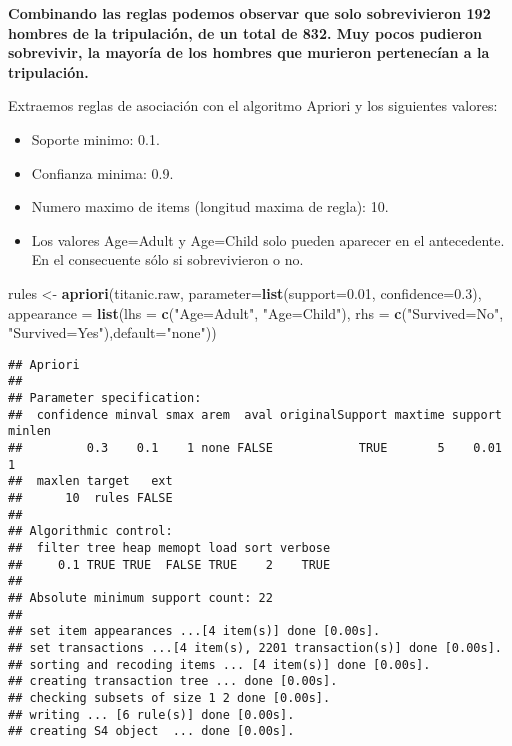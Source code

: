 \documentclass[]{article}
\newenvironment{Shaded}{\begin{snugshade}}{\end{snugshade}}
\newcommand{\DataTypeTok}[1]{\textcolor[rgb]{0.13,0.29,0.53}{#1}}
\newcommand{\FloatTok}[1]{\textcolor[rgb]{0.00,0.00,0.81}{#1}}
\newcommand{\KeywordTok}[1]{\textcolor[rgb]{0.13,0.29,0.53}{\textbf{#1}}}
\newcommand{\NormalTok}[1]{#1}
\newcommand{\StringTok}[1]{\textcolor[rgb]{0.31,0.60,0.02}{#1}}
\providecommand{\tightlist}{%
  \setlength{\itemsep}{0pt}\setlength{\parskip}{0pt}}
\begin{document}
\textbf{Combinando las reglas podemos observar que solo sobrevivieron
192 hombres de la tripulación, de un total de 832. Muy pocos pudieron
sobrevivir, la mayoría de los hombres que murieron pertenecían a la
tripulación.}

Extraemos reglas de asociación con el algoritmo Apriori y los siguientes
valores:

\begin{itemize}
\tightlist
\item
  Soporte minimo: 0.1.
\item
  Confianza minima: 0.9.
\item
  Numero maximo de items (longitud maxima de regla): 10.
\item
  Los valores Age=Adult y Age=Child solo pueden aparecer en el
  antecedente. En el consecuente sólo si sobrevivieron o no.
\end{itemize}

\begin{Shaded}
\begin{Highlighting}[]
\NormalTok{rules <-}\StringTok{ }\KeywordTok{apriori}\NormalTok{(titanic.raw, }\DataTypeTok{parameter=}\KeywordTok{list}\NormalTok{(}\DataTypeTok{support=}\FloatTok{0.01}\NormalTok{, }\DataTypeTok{confidence=}\FloatTok{0.3}\NormalTok{), }
                 \DataTypeTok{appearance =} \KeywordTok{list}\NormalTok{(}\DataTypeTok{lhs =} \KeywordTok{c}\NormalTok{(}\StringTok{"Age=Adult"}\NormalTok{, }\StringTok{"Age=Child"}\NormalTok{), }
                                   \DataTypeTok{rhs =} \KeywordTok{c}\NormalTok{(}\StringTok{"Survived=No"}\NormalTok{, }\StringTok{"Survived=Yes"}\NormalTok{),}\DataTypeTok{default=}\StringTok{"none"}\NormalTok{))}
\end{Highlighting}
\end{Shaded}

\begin{verbatim}
## Apriori
## 
## Parameter specification:
##  confidence minval smax arem  aval originalSupport maxtime support minlen
##         0.3    0.1    1 none FALSE            TRUE       5    0.01      1
##  maxlen target   ext
##      10  rules FALSE
## 
## Algorithmic control:
##  filter tree heap memopt load sort verbose
##     0.1 TRUE TRUE  FALSE TRUE    2    TRUE
## 
## Absolute minimum support count: 22 
## 
## set item appearances ...[4 item(s)] done [0.00s].
## set transactions ...[4 item(s), 2201 transaction(s)] done [0.00s].
## sorting and recoding items ... [4 item(s)] done [0.00s].
## creating transaction tree ... done [0.00s].
## checking subsets of size 1 2 done [0.00s].
## writing ... [6 rule(s)] done [0.00s].
## creating S4 object  ... done [0.00s].
\end{verbatim}
\end{document}
